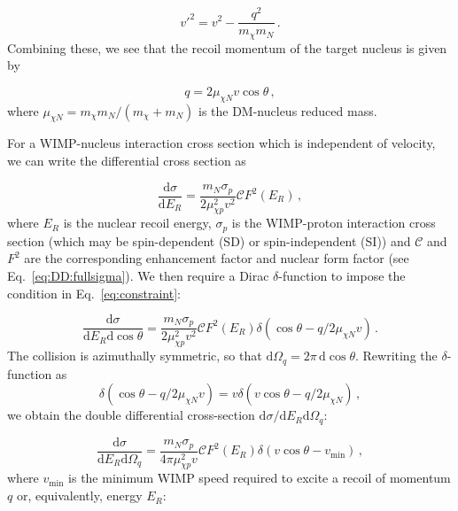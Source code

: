 \begin{equation}
\label{eq:Energy}
v'^2 = v^2 - \frac{q^2}{m_\chi m_N} \,.
\end{equation}
Combining these, we see that the recoil momentum of the target nucleus is given by

\begin{equation}
\label{eq:constraint}
q = 2\mu_{\chi N} v \cos \theta \,,
\end{equation}
where \(\mu_{\chi N} = m_\chi m_N/(m_\chi + m_N)\) is the DM-nucleus reduced mass.


For a WIMP-nucleus interaction cross section which is independent of velocity, we can write the differential cross section as 

\begin{equation}
\frac{\textrm{d}\sigma}{\textrm{d}E_R} = \frac{m_N \sigma_p}{2 \mu_{\chi p}^2 v^2} \mathcal{C} F^2(E_R)\,,
\end{equation}
where \(E_R\) is the nuclear recoil energy, \(\sigma_p\) is the WIMP-proton interaction cross section (which may be spin-dependent (SD) or spin-independent (SI)) and $\mathcal{C}$ and $F^2$ are the corresponding enhancement factor and nuclear form factor (see Eq.~\ref{eq:DD:fullsigma}). We then require a Dirac \(\delta\)-function to impose the condition in Eq.\ \ref{eq:constraint}:

\begin{equation}
\frac{\textrm{d}\sigma}{\textrm{d}E_R\textrm{d}\cos\theta} = \frac{m_N \sigma_p}{2 \mu_{\chi p}^2 v^2} \mathcal{C} F^2(E_R) \delta\left(\cos\theta - q/2\mu_{\chi N}v\right)\,.
\end{equation}
The collision is azimuthally symmetric, so that \(\textrm{d}\Omega_q = 2\pi\,\textrm{d}\cos\theta\). Rewriting the $\delta$-function as 
\begin{equation}
 \delta\left(\cos\theta - q/2\mu_{\chi N}v\right) = v \delta\left(v \cos\theta - q/2\mu_{\chi N}\right)\,,
\end{equation}
we obtain the double differential cross-section \(\textrm{d}\sigma/\textrm{d}E_R \textrm{d}\Omega_q\):

\begin{equation}
\frac{\textrm{d}\sigma}{\textrm{d}E_R \textrm{d}\Omega_q} = \frac{m_N \sigma_p}{4\pi\mu_{\chi p}^2v} \mathcal{C} F^2(E_R) \delta\left(v \cos\theta - v_\textrm{min}\right)\,,
\end{equation}
where \(v_\textrm{min}\) is the minimum WIMP speed required to excite a recoil of momentum \(q\) or, equivalently, energy \(E_R\):


